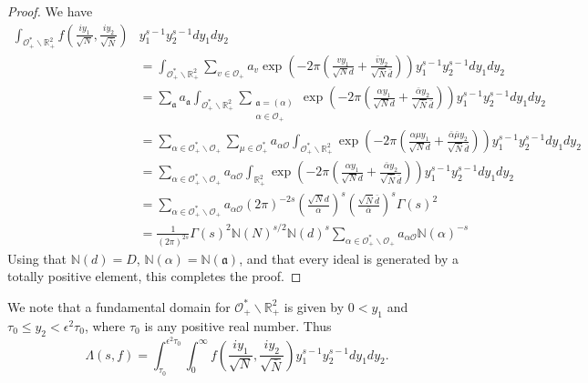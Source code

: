 \documentclass{article}
\theoremstyle{plain}
\begin{document}
\begin{proof}
We have
\begin{align*}
\int_{\mathcal{O}_+^*\backslash \mathbb{R}^2_+} f\left(\frac{iy_1}{\sqrt{N}},\frac{iy_2}{\sqrt{\bar{N}}}\right) & y_1^{s-1}y_2^{s-1} dy_1 dy_2 \\
&= \int_{\mathcal{O}_+^*\backslash \mathbb{R}^2_+} \sum_{v \in \mathcal{O}_+} a_v \exp\left( -2\pi \left(\frac{vy_1}{\sqrt{N} d}+\frac{\bar{v} y_2}{\sqrt{\bar{N}}\bar{d}}  \right)\right) y_1^{s-1}y_2^{s-1} dy_1 dy_2\\
&= \sum_{\mathfrak{a}} a_{\mathfrak{a}} \int_{\mathcal{O}_+^*\backslash \mathbb{R}^2_+} \sum_{\substack{\mathfrak{a}=(\alpha)\\ \alpha \in \mathcal{O}_+ }} \exp\left( -2\pi \left(\frac{\alpha y_1}{\sqrt{N} d}+\frac{\bar{\alpha} y_2}{\sqrt{\bar{N}}\bar{d}}  \right)\right)  y_1^{s-1}y_2^{s-1} dy_1 dy_2\\
& = \sum_{\alpha \in \mathcal{O}_+^* \backslash \mathcal{O}_+} \sum_{\mu \in \mathcal{O}_+^*} a_{\alpha \mathcal{O}} \int_{\mathcal{O}_+^*\backslash \mathbb{R}^2_+} \exp\left( -2\pi \left(\frac{\alpha \mu y_1}{\sqrt{N} d}+\frac{\bar{\alpha}\bar{\mu} y_2}{\sqrt{\bar{N}}\bar{d}}  \right)\right) y_1^{s-1}y_2^{s-1} dy_1 dy_2\\
& = \sum_{\alpha \in \mathcal{O}_+^* \backslash \mathcal{O}_+} a_{\alpha \mathcal{O}} \int_{\mathbb{R}^2_+} \exp\left( -2\pi \left(\frac{\alpha y_1}{\sqrt{N} d}+\frac{\bar{\alpha} y_2}{\sqrt{\bar{N}}\bar{d}}  \right)\right) y_1^{s-1}y_2^{s-1} dy_1 dy_2\\
&= \sum_{\alpha \in \mathcal{O}_+^* \backslash \mathcal{O}_+} a_{\alpha \mathcal{O}} (2 \pi)^{-2s} \left(\frac{\sqrt{N}d}{\alpha}\right)^s\left(\frac{\sqrt{\bar{N}}\bar{d}}{\bar{\alpha}}\right)^s \Gamma(s)^2\\
&= \frac{1}{(2\pi)^{2s}} \Gamma(s)^2 \mathbb{N}(N)^{s/2} \mathbb{N}(d)^s \sum_{\alpha \in \mathcal{O}_+^* \backslash \mathcal{O}_+} a_{\alpha \mathcal{O}} \mathbb{N}(\alpha)^{-s}  
\end{align*}
Using that  $\mathbb{N}(d)=D$, $\mathbb{N}(\alpha)= \mathbb{N}(\mathfrak{a})$, and that every ideal is generated by a totally positive element, this completes the proof.
\end{proof}

We note that a fundamental domain for $\mathcal{O}_+^*\backslash \mathbb{R}^2_+$ is given by $0<y_1$ and $\tau_0 \leq y_2 < \epsilon^2 \tau_0$, where $\tau_0$ is any positive real number. Thus
\begin{equation}\label{usefulformula}
\Lambda(s,f)= \int_{\tau_0}^{\epsilon^2 \tau_0}\int_{0}^{\infty} f\left(\frac{iy_1}{\sqrt{N}},\frac{iy_2}{\sqrt{\bar{N}}}\right) y_1^{s-1}y_2^{s-1} dy_1 dy_2.
\end{equation}
\end{document}
